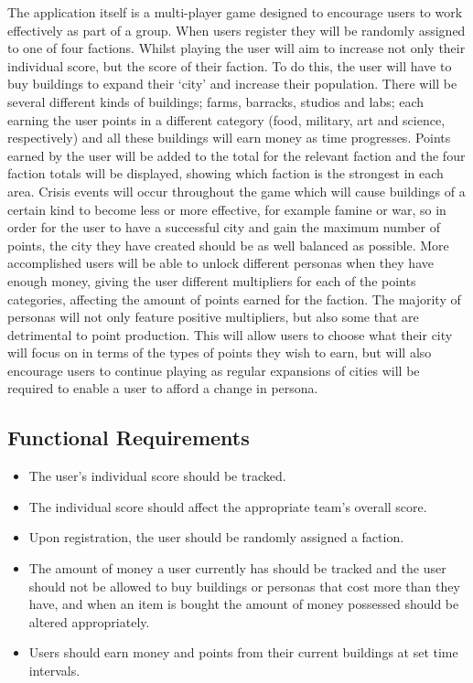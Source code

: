 \documentclass{sig-alt-release2}
\begin{document}
The application itself is a multi-player game designed to encourage users to work effectively as part of a group. When users register they will be randomly assigned to one of four factions. Whilst playing the user will aim to increase not only their individual score, but the score of their faction. To do this, the user will have to buy buildings to expand their `city' and increase their population. There will be several different kinds of buildings; farms, barracks, studios and labs; each earning the user points in a different category (food, military, art and science, respectively) and all these buildings will earn money as time progresses. Points earned by the user will be added to the total for the relevant faction and the four faction totals will be displayed, showing which faction is the strongest in each area. Crisis events will occur throughout the game which will cause buildings of a certain kind to become less or more effective, for example famine or war, so in order for the user to have a successful city and gain the maximum number of points, the city they have created should be as well balanced as possible. More accomplished users will be able to unlock different personas when they have enough money, giving the user different multipliers for each of the points categories, affecting the amount of points earned for the faction. The majority of personas will not only feature positive multipliers, but also some that are detrimental to point production. This will allow users to choose what their city will focus on in terms of the types of points they wish to earn, but will also encourage users to continue playing as regular expansions of cities will be required to enable a user to afford a change in persona.

\subsection{Functional Requirements}

\begin{itemize}

\item The user's individual score should be tracked.

\item The individual score should affect the appropriate team's overall score.

\item Upon registration, the user should be randomly assigned a faction.

\item The amount of money a user currently has should be tracked and the user should not be allowed to buy buildings or personas that cost more than they have, and when an item is bought the amount of money possessed should be altered appropriately.

\item Users should earn money and points from their current buildings at set time intervals.

\end{itemize}
 
\end{document}
